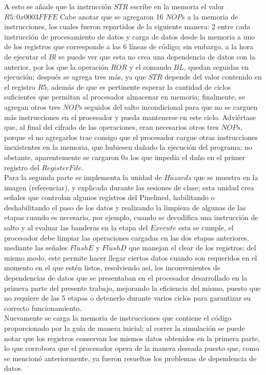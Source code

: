 A esto se añade que la instrucción $STR$ escribe en la memoria el valor $R5:0x0003FFFE$ %
Cabe anotar que se agregaron 16 $NOPs$ a la memoria de instrucciones, los cuales fueron repartidos de la siguiente manera: 2 entre cada instrucción de procesamiento de datos y carga de datos desde la memoria a uno de los registros que corresponde a las 6 líneas de código; sin embargo, a la hora de ejecutar el $Bl$ se puede ver que esta no crea una dependencia de datos con la anterior, por los que la operación $ROR$ y el comando $BL$, quedan seguidas en ejecución; después se agrega tres más, ya que $STR$ depende del valor contenido en el registro $R5$, además de que es pertinente esperar la cantidad de ciclos suficientes que permitan al procesador almacenar en memoria; finalmente, se agregan otros tres $NOPs$ seguidos del salto incondicional para que no se carguen más instrucciones en el procesador y pueda mantenerse en este ciclo. Adviértase que, al final del cifrado de las operaciones, eran necesarios otros tres $NOPs$, porque el no agregarlos trae consigo que el procesador cargue otras instrucciones inexistentes en la memoria, que hubiesen dañado la ejecución del programa; no obstante, aparentemente se cargaron $0s$ los que impedía el daño en el primer registro del $Register File$.\\

Para la segunda parte se implementa la unidad de $Hazards$ que se muestra en la imagen (referenciar), y explicada durante las sesiones de clase; esta unidad crea señales que controlan algunos registros del Pinelined, habilitando o deshabilitando el paso de los datos y realizando la limpieza de algunas de las etapas cuando es necesario, por ejemplo, cuando se decodifica una instrucción de salto y al evaluar las banderas en la etapa del $Execute$ esta se cumple, el procesador debe limpiar las operaciones cargadas en las dos etapas anteriores, mediante las señales $FlushE$ y $FlushD$ que manejan el clear de los registros; del mismo modo, este permite hacer llegar ciertos datos cuando son requeridos en el momento en el que estén listos, resolviendo así, los inconvenientes de dependencias de datos que se presentaban en el procesador desarrollado en la primera parte del presente trabajo, mejorando la eficiencia del mismo, puesto que no requiere de las 5 etapas o detenerlo durante varios ciclos para garantizar su correcto funcionamiento.\\ 

Nuevamente se carga la memoria de instrucciones que contiene el código proporcionado por la guía de manera inicial; al correr la simulación se puede notar que los registros conservan los mismos datos obtenidos en la primera parte, lo que corrobora que el procesador opera de la manera deseada puesto que, como se mencionó anteriormente, ya fueron resueltos los problemas de dependencia de datos.\\

